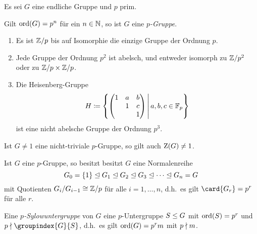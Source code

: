 Es sei $G$ eine endliche Gruppe und $p$ prim.

\begin{definition}
  Gilt $\operatorname{ord}(G) = p^n$ für ein $n \in \mathbb{N}$, so ist $G$ eine \emph{$p$-Gruppe}.
\end{definition}

\begin{example}
  \begin{enumerate}
    \item
      Es ist $\mathbb{Z}/p$ bis auf Isomorphie die einzige Gruppe der Ordnung $p$.
    \item
      Jede Gruppe der Ordnung $p^2$ ist abelsch, und entweder isomorph zu $\mathbb{Z}/p^2$ oder zu $\mathbb{Z}/p \times \mathbb{Z}/p$.
    \item
      Die Heisenberg-Gruppe
      \[
                  H
        \defined  \left\{
                    \begin{pmatrix}
                      1 & a & b \\
                        & 1 & c \\
                        &   & 1
                    \end{pmatrix}
                  \suchthat*
                    a, b, c \in \Finite_p
                  \right\}
      \]
      ist eine nicht abelsche Gruppe der Ordnung $p^3$.
  \end{enumerate}
\end{example}

\begin{lemma}
  Ist $G \neq 1$ eine nicht-triviale $p$-Gruppe, so gilt auch $\operatorname{Z}(G) \neq 1$.
\end{lemma}

\begin{corollary}
  Ist $G$ eine $p$-Gruppe, so besitzt besitzt $G$ eine Normalenreihe
  \[
                  G_0
    =             \{ 1 \}
    \mathrel{\trianglelefteq}  G_1
    \mathrel{\trianglelefteq}  G_2
    \mathrel{\trianglelefteq}  G_3
    \mathrel{\trianglelefteq}  \dotsb
    \mathrel{\trianglelefteq}  G_n
    =             G
  \]
  mit Quotienten $G_i / G_{i-1} \cong \mathbb{Z}/p$ für alle $i = 1, \dotsc, n$, d.h.\ es gilt $\card{G_r} = p^r$ für alle $r$.
\end{corollary}

\begin{definition}
  Eine \emph{$p$-Sylow\-unter\-gruppe} von $G$ eine $p$-Untergruppe $S \mathrel{\leq} G$ mit $\operatorname{ord}(S) = p^r$ und $p \notdivides \groupindex{G}{S}$, d.h.\ es gilt $\operatorname{ord}(G) = p^r m$ mit $p \mathrel{\nmid} m$.
\end{definition}

